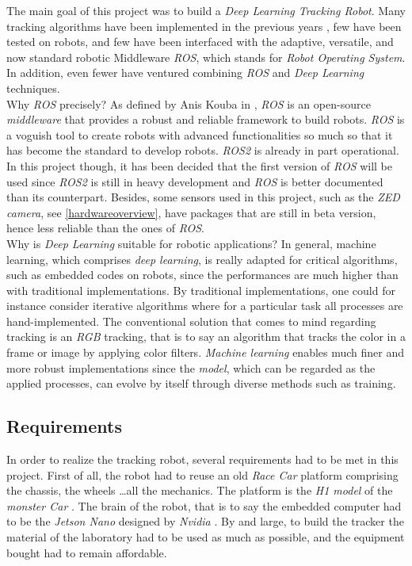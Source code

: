 		The main goal of this project was to build a \textit{Deep Learning Tracking Robot}. Many tracking
		algorithms have been implemented in the previous years \cite{trakinglist},
		few have been tested on robots, and 
		few have been interfaced with the adaptive, versatile, and 
		now standard robotic Middleware \textit{ROS}, which stands for \textit{Robot Operating System}.
		In addition, even fewer have ventured combining \textit{ROS} and \textit{Deep Learning} techniques. \cite{7090411, niko, tracker1}
		\\\indent Why \textit{ROS} precisely? As defined by Anis Kouba in \cite{ros}, \textit{ROS}
		is an \frstg{} open-source \textit{middleware} \lstg{} that provides a robust and reliable framework 
		to build robots. \textit{ROS} is a voguish tool to create robots with advanced functionalities so much so 
		that it has become the standard to develop robots. \textit{ROS2} is already in part 
		operational. In this project though, 
		it has been decided that the first version of \textit{ROS} will be used since \textit{ROS2} is still 
		in heavy development and \textit{ROS} is better documented than its counterpart. Besides, 
		some sensors used in this project, such as
		the \textit{ZED camera}, see \vref{hardwareoverview},
		have packages that are still in beta version, hence less reliable than the ones
		of \textit{ROS}.
		\\\indent Why is \textit{Deep Learning} suitable for robotic applications? In general, machine learning,
		which comprises \textit{deep learning},
		is really adapted for critical algorithms, such as embedded codes
		on robots, since the performances are much higher than with traditional implementations. By traditional
		implementations, one could for instance consider iterative algorithms where for a particular task 
		all processes are hand-implemented. The conventional solution 
		that comes to mind regarding tracking is an \textit{RGB} tracking, that is to say an 
		algorithm that tracks the color in a frame or image by applying 
		color filters. \textit{Machine learning} enables much finer and more robust
		implementations since the \textit{model},
		which can be regarded as the applied processes, can evolve by itself through diverse methods such as training.
		 
		\subsection{Requirements}
		
		In order to realize the tracking robot, several requirements had to be met in this
		project. First of all, the robot had to reuse an old \textit{Race Car} platform comprising
		the chassis, the wheels \dots all the mechanics. The platform is the \textit{H1 model}
		of the \textit{monster Car} \cite{datasheet}.
		The brain of the robot, that is to say 
		the embedded computer had to be the \textit{Jetson Nano} designed by \textit{Nvidia} \cite{nano}. By and
		large, to build the tracker the material of the laboratory had to be used as much as 
		possible, and the equipment bought had to remain affordable.
	
